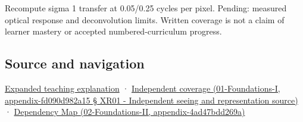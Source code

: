 Recompute sigma 1 transfer at 0.05/0.25 cycles per pixel. Pending: measured optical response and deconvolution limits. Written coverage is not a claim of learner mastery or accepted numbered-curriculum progress.

\subsection{Source and navigation}\label{source-and-navigation}

\href{Continuous\%20Notes/University\%20-\%20Worlds,\%20Images\%20and\%20Inference\%20-\%20Graphics,\%20Vision\%20and\%20Photography\#A\%20footprint\%20is\%20more\%20meaningful\%20than\%20an\%20isolated\%20pixel\%20center}{Expanded teaching explanation} · \href{}{Independent coverage (01-Foundations-I, appendix-fd090d982a15 § XR01 - Independent seeing and representation source)} · \href{}{Dependency Map (02-Foundations-II, appendix-4ad47bdd269a)}
